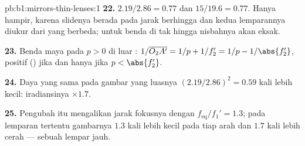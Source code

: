 \begin{solution}{pb:b1:mirrors-thin-lenses:1}
\textbf{22.} $2.19/2.86 = 0.77$ dan $15/19.6 = 0.77$. Hanya hampir,
karena slidenya berada pada jarak berhingga dan kedua lemparannya diukur
dari  yang berbeda; untuk benda di tak hingga nisbahnya akan eksak.

\textbf{23.} Benda maya pada $p > 0$ di luar :
$1/\overline{O_2A'} = 1/p + 1/f_2' = 1/p - 1/\abs{f_2'}$, positif
() jika dan hanya jika $p < \abs{f_2'}$.

\textbf{24.} Daya yang sama pada gambar yang luasnya $(2.19/2.86)^2 = 0.59$
kali lebih kecil: iradiansinya $\times 1.7$.

\textbf{25.} Pengubah itu mengalikan jarak fokusnya dengan
$f_{\mathrm{eq}}/f_1' = 1.3$; pada lemparan tertentu gambarnya $1.3$
kali lebih kecil pada tiap arah dan $1.7$ kali lebih cerah --- sebuah
 lempar jauh.
\end{solution}
